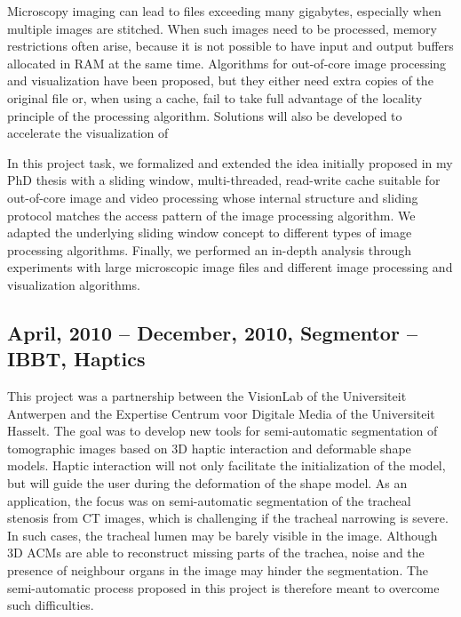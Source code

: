 \documentclass[a4paper]{article}
\begin{document}
Microscopy imaging can lead to files exceeding many gigabytes, especially when multiple images
are stitched. When such images need to be processed, memory restrictions often arise, because it
is not possible to have input and output buffers allocated in RAM at the same time. Algorithms for
out-of-core image processing and visualization have been proposed, but they either need extra
copies of the original file or, when using a cache, fail to take full advantage of the locality principle
of the processing algorithm. Solutions will also be developed to accelerate the visualization of

In this project task, we formalized and extended the idea initially proposed in my PhD thesis with a sliding window, multi-threaded, read-write cache suitable for out-of-core image and video processing whose internal structure and sliding protocol matches the access pattern of the image processing algorithm. We adapted the underlying sliding window concept to different types of image processing algorithms. Finally, we performed an in-depth analysis through experiments with large microscopic image files and different image processing and visualization algorithms.

\renewcommand{\refname}{Related publications}
\begin{bibunit}[unsrt]
\nocite{Pinho:Cache1}
\putbib[mybib]
\end{bibunit}

\subsection{April, 2010 -- December, 2010, Segmentor -- IBBT, Haptics}

This project was a partnership between the VisionLab of the Universiteit Antwerpen and the Expertise Centrum voor Digitale Media of the Universiteit Hasselt. The goal was to develop new tools for semi-automatic segmentation of tomographic images based on 3D haptic interaction and deformable shape models. Haptic interaction will not only facilitate the initialization of the model, but will guide the user during the deformation of the shape model. As an application, the focus was on semi-automatic segmentation of the tracheal stenosis from CT images, which is challenging if the tracheal narrowing is severe. In such cases, the tracheal lumen may be barely visible in the image. Although 3D ACMs are able to reconstruct missing parts of the trachea, noise and the presence of neighbour organs in the image may hinder the segmentation. The semi-automatic process proposed in this project is therefore meant to overcome such difficulties.
\end{document}
